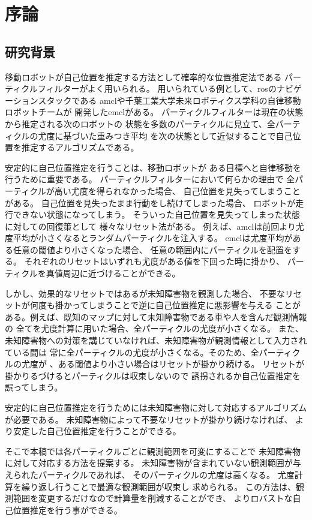 \chapter{序論}
\section{研究背景}
移動ロボットが自己位置を推定する方法として確率的な位置推定法である
パーティクルフィルターがよく用いられる。
用いられている例として、rosのナビゲーションスタックである
amcl\cite{amcl_github}や千葉工業大学未来ロボティクス学科の自律移動ロボットチームが
開発したemcl\cite{emcl_github}がある。
パーティクルフィルターは現在の状態から推定される次のロボットの
状態を多数のパーティクルに見立て、全パーティクルの尤度に基づいた重みつき平均
を次の状態として近似することで自己位置を推定するアルゴリズムである。

安定的に自己位置推定を行うことは、移動ロボットが
ある目標へと自律移動を行うために重要である。
パーティクルフィルターにおいて何らかの理由で
全パーティクルが高い尤度を得られなかった場合、
自己位置を見失ってしまうことがある。
自己位置を見失ったまま行動をし続けてしまった場合、
ロボットが走行できない状態になってしまう。
そういった自己位置を見失ってしまった状態に対しての回復策として
様々なリセット法がある。
例えば、amclは前回より尤度平均が小さくなるとランダムパーティクルを注入する。
emclは尤度平均がある任意の閾値より小さくなった場合、
任意の範囲内にパーティクルを配置をする\cite{ueda2004iros}。
それぞれのリセットはいずれも尤度がある値を下回った時に掛かり、
パーティクルを真値周辺に近づけることができる。

しかし、効果的なリセットではあるが未知障害物を観測した場合、
不要なリセットが何度も掛かってしまうことで逆に自己位置推定に悪影響を与える
ことがある。例えば、既知のマップに対して未知障害物である車や人を含んだ観測情報の
全てを尤度計算に用いた場合、全パーティクルの尤度が小さくなる。
また、未知障害物への対策を講じていなければ、未知障害物が観測情報として入力されている間は
常に全パーティクルの尤度が小さくなる。そのため、全パーティクルの尤度が
、ある閾値より小さい場合はリセットが掛かり続ける。
リセットが掛かりるづけるとパーティクルは収束しないので
誘拐されるか自己位置推定を誤ってしまう。

安定的に自己位置推定を行うためには未知障害物に対して対応するアルゴリズムが必要である。
未知障害物によって不要なリセットが掛かり続けなければ、
より安定した自己位置推定を行うことができる。

そこで本稿では各パーティクルごとに観測範囲を可変にすることで
未知障害物に対して対応する方法を提案する。
未知障害物が含まれていない観測範囲が与えられたパーティクルであれば、
そのパーティクルの尤度は高くなる。
尤度計算を繰り返し行うことで最適な観測範囲が収束し
求められる。
この方法は、観測範囲を変更するだけなので計算量を削減することができ、
よりロバストな自己位置推定を行う事ができる。

